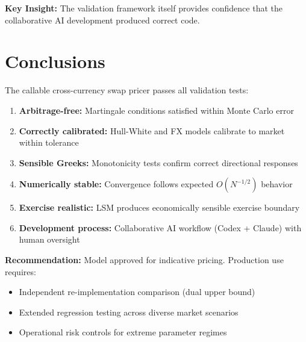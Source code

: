 \documentclass[conference]{IEEEtran}
\begin{document}
\textbf{Key Insight:} The validation framework itself provides confidence that the collaborative AI development produced correct code.

\section{Conclusions}

The callable cross-currency swap pricer passes all validation tests:

\begin{enumerate}
    \item \textbf{Arbitrage-free:} Martingale conditions satisfied within Monte Carlo error
    \item \textbf{Correctly calibrated:} Hull-White and FX models calibrate to market within tolerance
    \item \textbf{Sensible Greeks:} Monotonicity tests confirm correct directional responses
    \item \textbf{Numerically stable:} Convergence follows expected $O(N^{-1/2})$ behavior
    \item \textbf{Exercise realistic:} LSM produces economically sensible exercise boundary
    \item \textbf{Development process:} Collaborative AI workflow (Codex + Claude) with human oversight
\end{enumerate}

\noindent\textbf{Recommendation:} Model approved for indicative pricing. Production use requires:
\begin{itemize}
    \item Independent re-implementation comparison (dual upper bound)
    \item Extended regression testing across diverse market scenarios
    \item Operational risk controls for extreme parameter regimes
\end{itemize}
\end{document}
